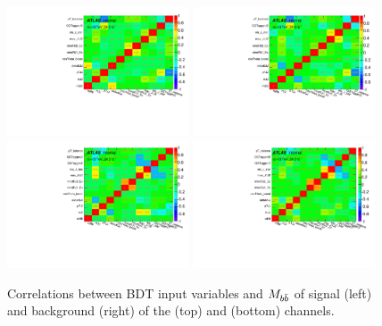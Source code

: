 \begin{figure}[htbp]
  \centering
 \includegraphics[width=0.48\textwidth]{figures/VBF/BDT_VBF_var_cor_2cen.pdf}
 \includegraphics[width=0.48\textwidth]{figures/VBF/BDT_data_var_cor_2cen.pdf}\\
 \includegraphics[width=0.48\textwidth]{figures/VBF/BDT_VBF_var_cor_4cen.pdf}
 \includegraphics[width=0.48\textwidth]{figures/VBF/BDT_data_var_cor_4cen.pdf}\\
\caption{Correlations between BDT input variables and $M_{b\bar{b}}$ of signal (left) and background (right) of  the \twocentral (top) and \fourcentral (bottom) channels.}
  \label{fig:vbf-BDTInputsCor}
\end{figure}


